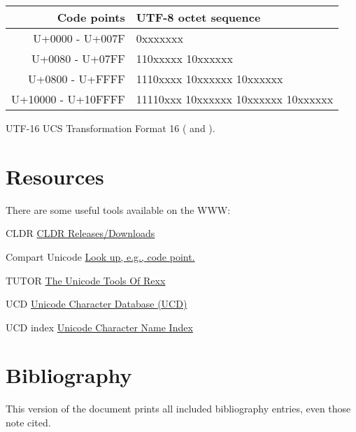 \documentclass[b4paper]{article}
\begin{document}
\begin{definition}
\begin{tabular}{| r | l |}
\hline
Code points & UTF-8 octet sequence \\
\hline
U+0000 - U+007F    & 0xxxxxxx \\
\hline
U+0080 - U+07FF    & 110xxxxx 10xxxxxx \\
\hline
U+0800 - U+FFFF    & 1110xxxx 10xxxxxx 10xxxxxx \\
\hline
U+10000 - U+10FFFF & 11110xxx 10xxxxxx 10xxxxxx 10xxxxxx \\
\hline
\end{tabular}
\item [UTF-16] UCS Transformation Format 16
(\cite{USTD:3.9} and \cite{RFC:2781}).
\end{definition}


\section{Resources}
There are some useful tools available on the WWW:

\begin{resource}
\item[CLDR]%
\href{https://cldr.unicode.org/index/downloads}%
{CLDR Releases/Downloads}

\item[Compart Unicode]%
\href{https://www.compart.com/en/unicode/}%
{Look up, e.g., code point.}

\item[TUTOR]%
\href{https://github.com/RexxLA/rexx-repository/tree/master/ARB/standards/work-in-progress/unicode/UnicodeTools}%
{The Unicode Tools Of Rexx}

\item[UCD]%
\href{https://www.unicode.org/Public/UCD/latest/}%
{Unicode{\textregistered} Character Database (UCD)}

\item[UCD index]%
\href{https://www.unicode.org/charts/charindex.html}%
{Unicode{\textregistered} Character Name Index}
\end{resource}


\section{Bibliography}
This version of the document prints all included bibliography entries, even those note cited.
\nocite{*}

\printbibliography[%
    keyword=ARB,%
    title={GitHub ARB documents}%
    ]
\printbibliography[%
    keyword=FAQ,%
    title=FAQs%
    ]
\printbibliography[%
    check={standard},%
    notkeyword={FAQ},%
    title={Official documents}%
    ]


\printindex
\end{document}
